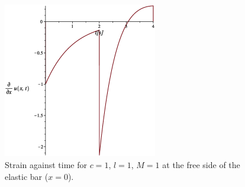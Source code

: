\documentclass{article}
\begin{document}
\begin{figure}[H]
    \centering
    \includegraphics[width = 0.6\textwidth ]{figures/strain.eps}
    \caption{Strain against time for $c = 1$, $ l = 1$,  $M = 1$ at the free side of the elastic bar ($x = 0$).}
    \label{fig:strain}
\end{figure}


% 
% 
\end{document}

